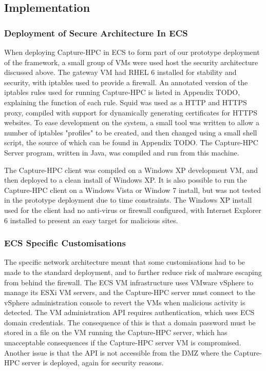 \subsection{Implementation}

\subsubsection{Deployment of Secure Architecture In ECS}


When deploying Capture-HPC in ECS to form part of our prototype deployment of
the framework, a small group of VMs were used host the security architecture
discussed above. The gateway VM had RHEL 6 installed for stability and security,
with iptables used to provide a firewall. An annotated version of the iptables
rules used for running Capture-HPC is listed in Appendix TODO, explaining the
function of each rule. Squid was used as a HTTP and HTTPS proxy, compiled with
support for dynamically generating certificates for HTTPS websites. To ease 
development on the system, a small tool was written to allow a number of
iptables "profiles" to be created, and then changed using a small shell script,
the source of which can be found in Appendix TODO. The Capture-HPC Server
program, written in Java, was compiled and run from this machine.

The Capture-HPC client was compiled on a Windows XP development VM, and then
deployed to a clean install of Windows XP. It is also possible to run the
Capture-HPC client on a Windows Vista or Window 7 install, but was not tested in
the prototype deployment due to time constraints. The Windows XP install used
for the client had no anti-virus or firewall configured, with Internet Explorer
6 installed to present an easy target for malicious sites.

\subsubsection{ECS Specific Customisations}

The specific network architecture meant that some customisations had to be made
to the standard deployment, and to further reduce risk of malware escaping from
behind the firewall. The ECS VM infrastructure uses VMware vSphere to manage its
ESXi VM servers, and the Capture-HPC server must connect to the vSphere
administration console to revert the VMs when malicious activity is detected.
The VM administration API requires authentication, which uses ECS domain
credentials. The consequence of this is that a domain password must be stored in
a file on the VM running the Capture-HPC server, which has unacceptable
consequences if the Capture-HPC server VM is compromised. Another issue is that
the API is not accessible from the DMZ where the Capture-HPC server is deployed,
again for security reasons.

